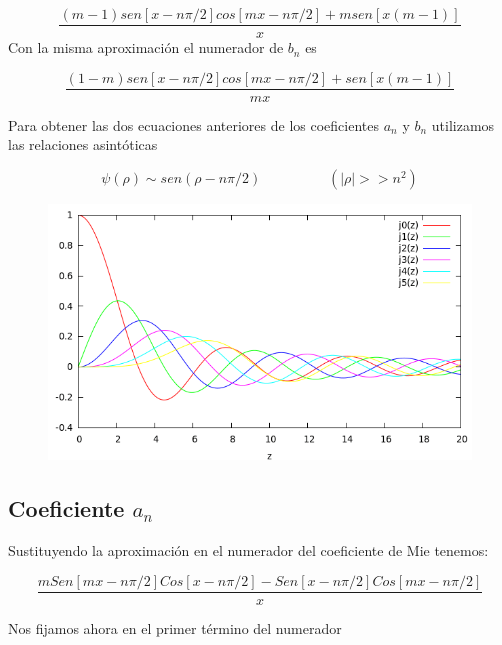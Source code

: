 \documentclass[11pt]{article}
\begin{document}
\begin{equation}
    \frac{(m-1)sen[x-n\pi/2]cos[mx-n\pi/2]+msen[x(m-1)]}{x}
\end{equation}
Con la misma aproximación el numerador de $b_{n}$ es

\begin{equation}
    \frac{(1-m)sen[x-n\pi/2]cos[mx-n\pi/2]+sen[x(m-1)]}{mx}
\end{equation}

Para obtener las dos ecuaciones anteriores de los coeficientes $a_{n}$ y $b_{n}$ utilizamos las relaciones asintóticas 

\begin{equation}
    \psi(\rho) \sim sen(\rho-n\pi/2) \hspace{2cm} (|\rho|>> n^{2})
\end{equation}


\begin{figure}[H]
\centering
\includegraphics[scale=0.6]{3.png}
\label{fig:p0}
\end{figure}


\subsection*{Coeficiente $a_{n}$}
Sustituyendo la aproximación en el numerador del coeficiente de Mie tenemos:

\begin{equation}
 \frac{mSen[mx-n\pi/2]Cos[x-n\pi/2]-Sen[x-n\pi/2]Cos[mx-n\pi/2]}{x}
\end{equation}

Nos fijamos ahora en el primer término del numerador
\end{document}
